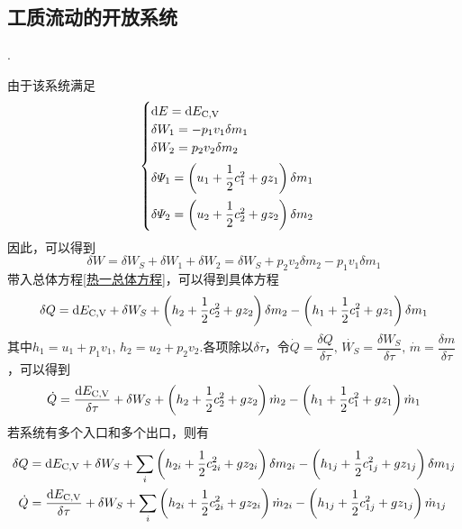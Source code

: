 \subsection{工质流动的开放系统}
. \dya[一般情况]\rgap
\par 由于该系统满足
\begin{equation}
	\begin{cases}
		{\rm{d}} E = {\rm{d}} E_{\text{C,V}}\\
		\delta W_1 = -p_1v_1\delta m_1\\ 
		\delta W_2 = p_2 v_2 \delta m_2\\[0.5em]
		\delta \varPsi_1 = \left(u_1 + \dfrac 1 2 c_1^2 + gz_1\right)\delta m_1\\[1em]
		\delta \varPsi_2 = \left(u_2 + \dfrac 1 2 c_2^2 + g z_2\right)\delta m_2 
	\end{cases}
\end{equation}
因此，可以得到
\begin{equation}
		\delta W = \delta W_S + \delta W_1 + \delta W_2 = \delta W_S + p_2v_2\delta m_2 - p_1v_1\delta m_1
\end{equation}
带入总体方程\eqref{热一总体方程}，可以得到具体方程
\begin{equation}
	\delta Q = {\rm{d}} E_{\text{C,V}} + \delta W_S + \left(h_2 + \frac 1 2 c_2^2 + gz_2\right)\delta m_2 - \left(h_1 + \frac 1 2 c_1^2 + gz_1\right)\delta m_1
\end{equation}
其中$h_1 = u_1 + p_1v_1, \, h_2 = u_2 + p_2 v_2.$各项除以$\delta \tau$，令$\dot{Q} = \dfrac{\delta Q}{\delta \tau},\, \dot{W_S}=\dfrac{\delta W_S}{\delta \tau}, \, \dot{m} = \dfrac{\delta m}{\delta \tau }$，可以得到
\begin{equation}
	\dot{Q} = \frac{{\rm{d}} E_{\text{C,V}}}{\delta \tau} + \delta W_S + \left(h_2 + \frac 1 2 c_2^2 + gz_2\right)\dot{m}_2 - \left(h_1 + \frac 1 2 c_1^2 + gz_1\right)\dot{m}_1
\end{equation}
若系统有多个入口和多个出口，则有
	\begin{align}
		\delta Q &= {\rm{d}} E_{\text{C,V}} + \delta W_S + \sum_i \left(h_{2i} + \frac 1 2 c_{2i}^2 + gz_{2i}\right)\delta m_{2i} - \left(h_{1j} + \frac 1 2 c_{1j}^2 + gz_{1j}\right)\delta m_{1j}\\
		\dot{Q} &= \frac{{\rm{d}} E_{\text{C,V}}}{\delta \tau} + \delta W_S + \sum_i \left(h_{2i} + \frac 1 2 c_{2i}^2 + gz_{2i}\right)\dot{m}_{2i} - \left(h_{1j} + \frac 1 2 c_{1j}^2 + gz_{1j}\right)\dot{m}_{1j}
	\end{align}

